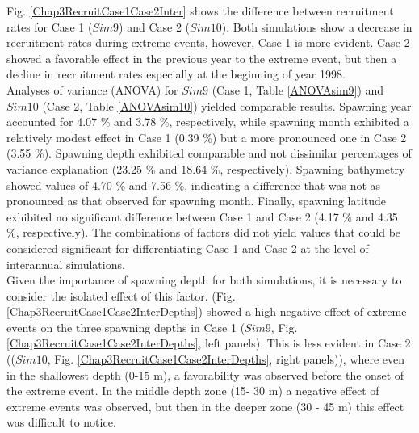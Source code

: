 Fig. \ref{Chap3RecruitCase1Case2Inter} shows the difference between recruitment rates for Case 1 ($Sim 9$) and Case 2 ($Sim 10$). Both simulations show a decrease in recruitment rates during extreme events, however, Case 1 is more evident. Case 2 showed a favorable effect in the previous year to the extreme event, but then a decline in recruitment rates especially at the beginning of year 1998.\\

Analyses of variance (ANOVA) for $Sim 9$ (Case 1, Table \ref{ANOVAsim9}) and $Sim 10$ (Case 2, Table \ref{ANOVAsim10}) yielded comparable results. Spawning year accounted for 4.07 \% and 3.78 \%, respectively, while spawning month exhibited a relatively modest effect in Case 1 (0.39 \%) but a more pronounced one in Case 2 (3.55 \%). Spawning depth exhibited comparable and not dissimilar percentages of variance explanation (23.25 \% and 18.64 \%, respectively). Spawning bathymetry showed values of 4.70 \% and 7.56 \%, indicating a difference that was not as pronounced as that observed for spawning month. Finally, spawning latitude exhibited no significant difference between Case 1 and Case 2 (4.17 \% and 4.35 \%, respectively). The combinations of factors did not yield values that could be considered significant for differentiating Case 1 and Case 2 at the level of interannual simulations.\\

Given the importance of spawning depth for both simulations, it is necessary to consider the isolated effect of this factor. (Fig. \ref{Chap3RecruitCase1Case2InterDepths}) showed a high negative effect of extreme events on the three spawning depths in Case 1 ($Sim 9$, Fig. \ref{Chap3RecruitCase1Case2InterDepths}, left panels). This is less evident in Case 2 (($Sim 10$, Fig. \ref{Chap3RecruitCase1Case2InterDepths}, right panels)), where even in the shallowest depth (0-15 m), a favorability was observed before the onset of the extreme event. In the middle depth zone (15- 30 m) a negative effect of extreme events was observed, but then in the deeper zone (30 - 45 m) this effect was difficult to notice.

